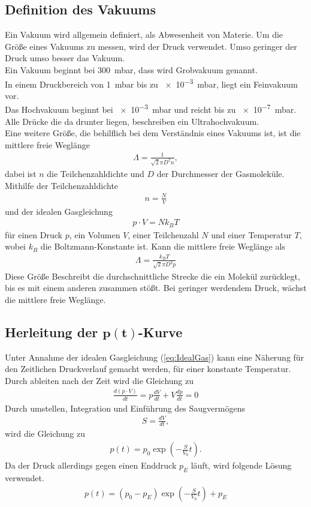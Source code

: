 \subsection{Definition des Vakuums}
Ein Vakuum wird allgemein definiert, als Abwesenheit von Materie.
Um die Größe eines Vakuums zu messen, wird der Druck verwendet. Umso geringer der Druck umso besser das Vakuum.\\
Ein Vakuum beginnt bei \SI{300}{\milli\bar}, dass wird Grobvakuum genannt.\\
In einem Druckbereich von \SI{1}{\milli\bar} bis zu \SI{e-3}{\milli\bar}, liegt ein Feinvakuum vor.\\
Das Hochvakuum beginnt bei \SI{e-3}{\milli\bar} und reicht bis zu \SI{e-7}{\milli\bar}. Alle Drücke die da drunter liegen, beschreiben ein Ultrahochvakuum.\\
Eine weitere Größe, die behilflich bei dem Verständnis eines Vakuums ist, ist die mittlere freie Weglänge
\begin{align}
\Lambda = \frac{1}{\sqrt{2}\pi D^2n},
\end{align}
dabei ist $n$ die Teilchenzahldichte und $D$ der Durchmesser der Gasmoleküle. Mithilfe der Teilchenzahldichte 
\begin{align}
n=\frac{N}{V}
\end{align}
und der idealen Gasgleichung
\begin{align}
p\cdot V = N k_B T \label{eq:IdealGas}
\end{align}
für einen Druck $p$, ein Volumen $V$, einer Teilchenzahl $N$ und einer Temperatur $T$, wobei $k_B$ die Boltzmann-Konstante ist.
Kann die mittlere freie Weglänge als
\begin{align}
\Lambda = \frac{k_BT}{\sqrt{2}\pi D^2p}
\end{align} 
Diese Größe Beschreibt die durchschnittliche Strecke die ein Molekül zurücklegt, bis es mit einem anderen zusammen stößt. Bei geringer werdendem Druck, wächst die mittlere freie Weglänge.

\subsection[Herleitung der $p(t)$-Kurve]{Herleitung der $\mathbf{p(t)}$-Kurve}
Unter Annahme der idealen Gasgleichung (\ref{eq:IdealGas})
kann eine Näherung für den Zeitlichen Druckverlauf gemacht werden, für einer konstante Temperatur.
Durch ableiten nach der Zeit wird die Gleichung zu
\begin{align}
\frac{d\left(p\cdot V \right)}{dt}=p\frac{dV}{dt}+V\frac{dp}{dt}=0
\end{align}
Durch umstellen, Integration und Einführung des Saugvermögens 
\begin{align}
S=\frac{dV}{dt},
\end{align}  wird die Gleichung zu
\begin{align}
p(t) = p_0 \exp\left(-\frac{S}{V_0}t\right).
\end{align}
Da der Druck allerdings gegen einen Enddruck $p_E$ läuft, wird folgende Lösung verwendet.
\begin{align}
p(t) = \left( p_0-p_E \right) \exp\left(-\frac{S}{V_0}t\right) + p_E
\label{eq:Evakuierungskurve}
\end{align}
